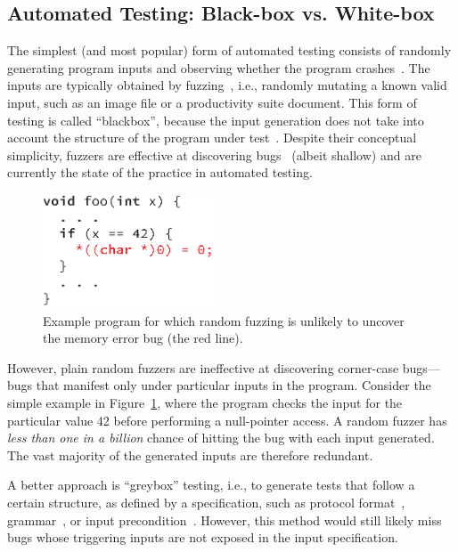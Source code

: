 \subsection{Automated Testing: Black-box vs. White-box}

The simplest (and most popular) form of automated testing consists of randomly generating program inputs and observing whether the program crashes~\cite{fuzz,quickcheck,afl,autodafe,skipfish}.
%
The inputs are typically obtained by fuzzing~\cite{fuzz}, i.e., randomly mutating a known valid input, such as an image file or a productivity suite document.  This form of testing is called ``blackbox'', because the input generation does not take into account the structure of the program under test~\cite{blackbox-testing}.
%
Despite their conceptual simplicity, fuzzers are effective at discovering  bugs~\cite{afl,autodafe,skipfish} (albeit shallow) and are currently the state of the practice in automated testing.

\begin{figure}
  \centering
  \includegraphics[width=2.0in]{figures/intro/fuzzing-example}
  \caption{Example program for which random fuzzing is unlikely to uncover the memory error bug (the red line).}
  \label{fig:intro:fuzzing}
\end{figure}

However, plain random fuzzers are ineffective at discovering corner-case bugs---bugs that manifest only under particular inputs in the program.
%
Consider the simple example in Figure~\ref{fig:intro:fuzzing}, where the program checks the input for the particular value 42 before performing a null-pointer access.  A random fuzzer has \emph{less than one in a billion} chance of hitting the bug with each input generated.
%
The vast majority of the generated inputs are therefore redundant.

A better approach is ``greybox'' testing, i.e., to generate tests that follow a certain structure, as defined by a specification, such as protocol format~\cite{sulley}, grammar~\cite{quickcheck}, or input precondition~\cite{boyapati:korat}.
%
However, this method would still likely miss bugs whose triggering inputs are not exposed in the input specification.

